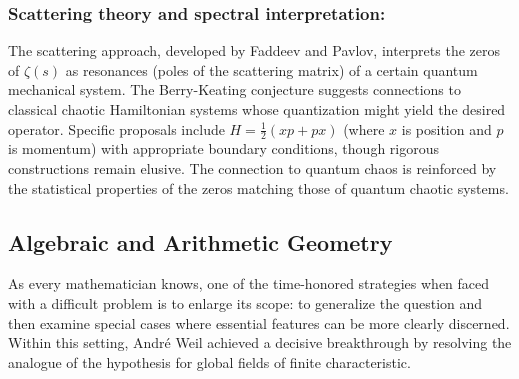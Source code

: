 \documentclass{article}
\begin{document}
   

    \subsubsection{Scattering theory and spectral interpretation:} The scattering approach, developed by Faddeev and Pavlov, interprets the zeros of $\zeta(s)$ as resonances (poles of the scattering matrix) of a certain quantum mechanical system. The Berry-Keating conjecture \cite{BerryKeatingChaos} suggests connections to classical chaotic Hamiltonian systems whose quantization might yield the desired operator. Specific proposals include $H =\frac 12( xp+px)$ (where $x$ is position and $p$ is momentum) with appropriate boundary conditions, though rigorous constructions remain elusive. The connection to quantum chaos is reinforced by the statistical properties of the zeros matching those of quantum chaotic systems.
    
    






\subsection{Algebraic and Arithmetic Geometry}

As every mathematician knows, one of the time-honored strategies when faced with a difficult problem is to enlarge its scope: to generalize the question and then examine special cases where essential features can be more clearly discerned. Within this setting, Andr\'e Weil achieved a decisive breakthrough by resolving the analogue of the hypothesis for global fields of finite characteristic. 
\end{document}
